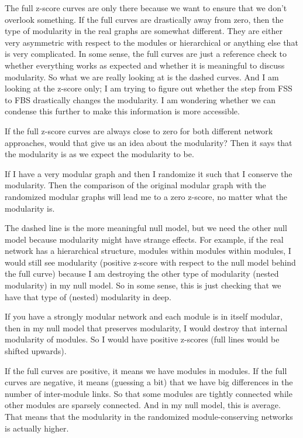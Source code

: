 

{\color{red}
		
	The full z-score curves are only there because we want to ensure that we don't overlook something. If the full curves are drastically away from zero, then the type of modularity in the real graphs are somewhat different. They are either very asymmetric with respect to the modules or hierarchical or anything else that is very complicated. In some sense, the full curves are just a reference check to whether everything works as expected and whether it is meaningful to discuss modularity. So what we are really looking at is the dashed curves. And I am looking at the z-score only; I am trying to figure out whether the step from FSS to FBS drastically changes the modularity. I am wondering whether we can condense this further to make this information is more accessible.
	
	If the full z-score curves are always close to zero for both different network approaches, would that give us an idea about the modularity? Then it says that the modularity is as we expect the modularity to be. 
	
	If I have a very modular graph and then I randomize it such that I conserve the modularity. Then the comparison of the original modular graph with the randomized modular graphs will lead me to a zero z-score, no matter what the modularity is. 
	
	The dashed line is the more meaningful null model, but we need the other null model because modularity might have strange effects. For example, if the real network has a hierarchical structure, modules within modules within modules, I would still see modularity (positive z-score with respect to the null model behind the full curve) because I am destroying the other type of modularity (nested modularity) in my null model. So in some sense, this is just checking that we have that type of (nested) modularity in deep.
	
	If you have a strongly modular network and each module is in itself modular, then in my null model that preserves modularity, I would destroy that internal modularity of modules. So I would have positive z-scores (full lines would be shifted upwards).
	
	If the full curves are positive, it means we have modules in modules. If the full curves are negative, it means (guessing a bit) that we have big differences in the number of inter-module links. So that some modules are tightly connected while other modules are sparsely connected. And in my null model, this is average. That means that the modularity in the randomized module-conserving networks is actually higher.
	
}
